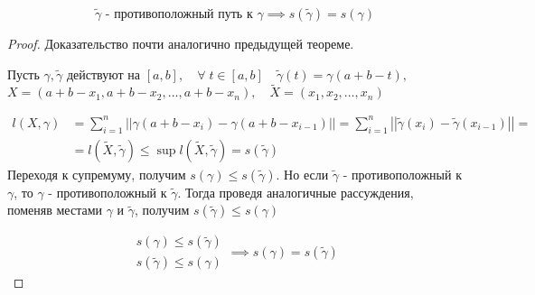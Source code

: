 \documentclass[../main.tex]{subfiles}
\begin{document}
\begin{thm}
    \[ \tilde{ \gamma }\text{ - противоположный путь к } \gamma \implies s( \tilde{ \gamma })=s\left( \gamma \right)\]
\end{thm}
\begin{proof}
    Доказательство почти аналогично предыдущей теореме. 

    Пусть \( \gamma , \tilde{ \gamma }\) действуют на \( \left[ a,b\right],\quad \forall \; t \in \left[ a,b\right]\quad \tilde{ \gamma }\left( t\right)= \gamma \left( a+b-t\right),\)
    \( X=(a+b-x_1,a+b-x_2, \dots,a+b-x_n),\quad \tilde{ X}=(x_1, x_2, \dots, x_n)\)

    \begin{equation*}
        \begin{aligned}
            l \left( X, \gamma \right)&= \sum\limits_{ i=1}^{ n} \left| \left| \gamma \left( a+b-x_i\right)- \gamma \left( a+b-x_{i-1}\right)\right|\right|= \sum\limits_{ i=1}^{ n} \left| \left| \tilde{ \gamma }\left( x_i\right)- \tilde{ \gamma }\left( x_{i-1}\right)\right|\right|=\\
            &=l( \tilde{ X}, \tilde{ \gamma }) \leq \sup\limits_{ } l( \tilde{ X}, \tilde{ \gamma })=s( \tilde{ \gamma } )
        \end{aligned}
    \end{equation*}
    Переходя к супремуму, получим \( s\left( \gamma \right) \leq s\left( \tilde{ \gamma }\right)\). Но если \( \tilde{ \gamma }\) - противоположный к \( \gamma \), то \( \gamma \) - противоположный к \( \tilde{ \gamma }\). Тогда проведя аналогичные рассуждения, поменяв местами \( \gamma \) и \( \tilde{ \gamma }\), получим \( s( \tilde{ \gamma }) \leq s\left( \gamma \right)\)

    \begin{equation*}
        \begin{aligned}
            s\left( \gamma \right) \leq s\left( \tilde{ \gamma }\right)\\ 
            s\left( \tilde{ \gamma }\right) \leq s\left( \gamma \right)
        \end{aligned}
        \implies 
        s\left( \gamma \right)=s\left( \tilde{ \gamma }\right)
    \end{equation*}
\end{proof}
\end{document}

